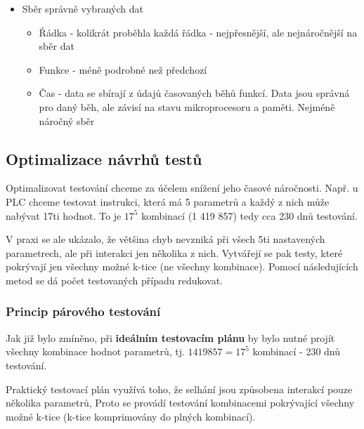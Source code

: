 \begin{itemize}[itemsep=0px]
\begin{itemize}[itemsep=0px]
\begin{itemize}[itemsep=0px]
        \item Sběr správně vybraných dat
            \begin{itemize}[itemsep=0px]
            \item Řádka - kolikrát proběhla každá řádka - nejpřesnější, ale nejnáročnější na sběr dat
            \item Funkce - méně podrobné než předchozí
            \item Čas - data se sbírají z údajů časovaných běhů funkcí. Data jsou správná pro daný běh, ale závisí na stavu mikroprocesoru a paměti. Nejméně náročný sběr
            \end{itemize}
        \end{itemize}
    \end{itemize}
\end{itemize}

\subsection{Optimalizace návrhů testů}

Optimalizovat testování chceme za účelem snížení jeho časové náročnosti. Např. u PLC chceme testovat instrukci, která má 5 parametrů a každý z nich může nabývat 17ti hodnot. To je $17^5$ kombinací (1 419 857) tedy cca 230 dnů testování.

V praxi se ale ukázalo, že většina chyb nevzniká při všech 5ti nastavených parametrech, ale při interakci jen několika z nich. Vytvářejí se pak testy, které pokrývají jen všechny možné k-tice (ne všechny kombinace). Pomocí následujících metod se dá počet testovaných případu redukovat.

\subsubsection{Princip párového testování}
Jak již bylo zmíněno, při \textbf{ideálním testovacím plánu} by bylo nutné projít všechny kombinace hodnot parametrů, tj. $1 419 857 = 17^5$ kombinací - 230 dnů testování.


Praktický testovací plán využívá toho, že selhání jsou způsobena interakcí pouze několika parametrů, Proto se provádí testování kombinacemi pokrývající všechny možné k-tice (k-tice komprimovány do plných kombinací).

